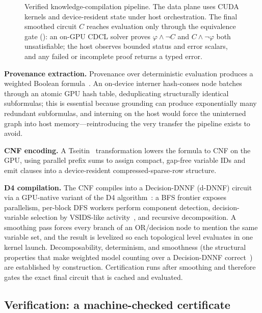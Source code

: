 \begin{figure}[tbp]
  \caption{Verified knowledge-compilation pipeline. The data plane uses CUDA
  kernels and device-resident state under host orchestration. The final smoothed
  circuit $C$ reaches evaluation only through the equivalence gate (\checkmark):
  an on-GPU CDCL solver proves $\varphi\wedge\lnot C$ and
  $C\wedge\lnot\varphi$ both unsatisfiable; the host observes bounded status and
  error scalars, and any failed or incomplete proof returns a typed error.}
  \label{fig:kc}
\end{figure}

\textbf{Provenance extraction.} Provenance over deterministic evaluation produces a weighted Boolean formula~\cite{green2007provenance}. An on-device interner hash-conses node batches through an atomic GPU hash table, deduplicating structurally identical subformulas; this is essential because grounding can produce exponentially many redundant subformulas, and interning on the host would force the uninterned graph into host memory---reintroducing the very transfer the pipeline exists to avoid.

\textbf{CNF encoding.} A Tseitin~\cite{tseitin} transformation lowers the formula to CNF on the GPU, using parallel prefix sums to assign compact, gap-free variable IDs and emit clauses into a device-resident compressed-sparse-row structure.

\textbf{D4 compilation.} The CNF compiles into a Decision-DNNF (d-DNNF) circuit~\cite{darwiche2001dnnf} via a GPU-native variant of the D4 algorithm~\cite{d4compiler}: a BFS frontier exposes parallelism, per-block DFS workers perform component detection, decision-variable selection by VSIDS-like activity~\cite{chaff}, and recursive decomposition. A smoothing pass forces every branch of an OR/decision node to mention the same variable set, and the result is levelized so each topological level evaluates in one kernel launch. Decomposability, determinism, and smoothness (the structural properties that make weighted model counting over a Decision-DNNF correct~\cite{darwicheMarquis2002,chaviraDarwiche2008}) are established by construction. Certification runs after smoothing and therefore gates the exact final circuit that is cached and evaluated.

\subsection{Verification: a machine-checked certificate}

